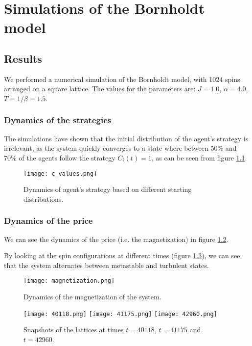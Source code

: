 \chapter{Simulations of the Bornholdt model}\label{ch:chapter3}
\section{Results}
We performed a numerical simulation of the Bornholdt model, with 1024 spins arranged on a square lattice. The values for the parameters are: $J=1.0$, $\alpha=4.0$, $T=1/\beta=1.5$. 
\subsection{Dynamics of the strategies}
The simulations have shown that the initial distribution of the agent's strategy is irrelevant, as the system quickly converges to a state where between 50\% and 70\% of the agents follow the strategy $C_i(t) = 1$, as can be seen from figure \ref{fig:strategies}.

\begin{figure}[H]
    \centering
    \texttt{[image: c\_values.png]}
    \caption{Dynamics of agent's strategy based on different starting distributions.}
    \label{fig:strategies}
\end{figure}

\subsection{Dynamics of the price}
We can see the dynamics of the price (i.e. the magnetization) in figure \ref{fig:magnetization}.

By looking at the spin configurations at different times (figure \ref{fig:lattices}), we can see that the system alternates between metastable and turbulent states.

\begin{figure}[H]
    \centering
    \texttt{[image: magnetization.png]}
    \caption{Dynamics of the magnetization of the system.}
    \label{fig:magnetization}
\end{figure}

\begin{figure}[H]
    \centering
    \texttt{[image: 40118.png]}
    \texttt{[image: 41175.png]}
    \texttt{[image: 42960.png]}
    \caption{Snapshots of the lattices at times $t=40118$, $t=41175$ and $t=42960$.}
    \label{fig:lattices}
\end{figure}

